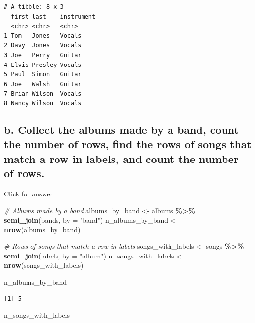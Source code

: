 \documentclass[
]{book}
\newenvironment{Shaded}{\begin{snugshade}}{\end{snugshade}}
\newcommand{\AttributeTok}[1]{\textcolor[rgb]{0.13,0.29,0.53}{#1}}
\newcommand{\CommentTok}[1]{\textcolor[rgb]{0.56,0.35,0.01}{\textit{#1}}}
\newcommand{\FunctionTok}[1]{\textcolor[rgb]{0.13,0.29,0.53}{\textbf{#1}}}
\newcommand{\NormalTok}[1]{#1}
\newcommand{\OtherTok}[1]{\textcolor[rgb]{0.56,0.35,0.01}{#1}}
\newcommand{\SpecialCharTok}[1]{\textcolor[rgb]{0.81,0.36,0.00}{\textbf{#1}}}
\newcommand{\StringTok}[1]{\textcolor[rgb]{0.31,0.60,0.02}{#1}}
\begin{document}
\begin{verbatim}
# A tibble: 8 x 3
  first last    instrument
  <chr> <chr>   <chr>     
1 Tom   Jones   Vocals    
2 Davy  Jones   Vocals    
3 Joe   Perry   Guitar    
4 Elvis Presley Vocals    
5 Paul  Simon   Guitar    
6 Joe   Walsh   Guitar    
7 Brian Wilson  Vocals    
8 Nancy Wilson  Vocals    
\end{verbatim}

\hypertarget{b.-collect-the-albums-made-by-a-band-count-the-number-of-rows-find-the-rows-of-songs-that-match-a-row-in-labels-and-count-the-number-of-rows.}{%
\subsection{b. Collect the albums made by a band, count the number of rows, find the rows of songs that match a row in labels, and count the number of rows.}\label{b.-collect-the-albums-made-by-a-band-count-the-number-of-rows-find-the-rows-of-songs-that-match-a-row-in-labels-and-count-the-number-of-rows.}}

Click for answer

\begin{Shaded}
\begin{Highlighting}[]
\CommentTok{\# Albums made by a band}
\NormalTok{albums\_by\_band }\OtherTok{\textless{}{-}}\NormalTok{ albums }\SpecialCharTok{\%\textgreater{}\%} \FunctionTok{semi\_join}\NormalTok{(bands, }\AttributeTok{by =} \StringTok{"band"}\NormalTok{)}
\NormalTok{n\_albums\_by\_band }\OtherTok{\textless{}{-}} \FunctionTok{nrow}\NormalTok{(albums\_by\_band)}

\CommentTok{\# Rows of songs that match a row in labels}
\NormalTok{songs\_with\_labels }\OtherTok{\textless{}{-}}\NormalTok{ songs }\SpecialCharTok{\%\textgreater{}\%} \FunctionTok{semi\_join}\NormalTok{(labels, }\AttributeTok{by =} \StringTok{"album"}\NormalTok{)}
\NormalTok{n\_songs\_with\_labels }\OtherTok{\textless{}{-}} \FunctionTok{nrow}\NormalTok{(songs\_with\_labels)}

\NormalTok{n\_albums\_by\_band}
\end{Highlighting}
\end{Shaded}

\begin{verbatim}
[1] 5
\end{verbatim}

\begin{Shaded}
\begin{Highlighting}[]
\NormalTok{n\_songs\_with\_labels}
\end{Highlighting}
\end{Shaded}
\end{document}
